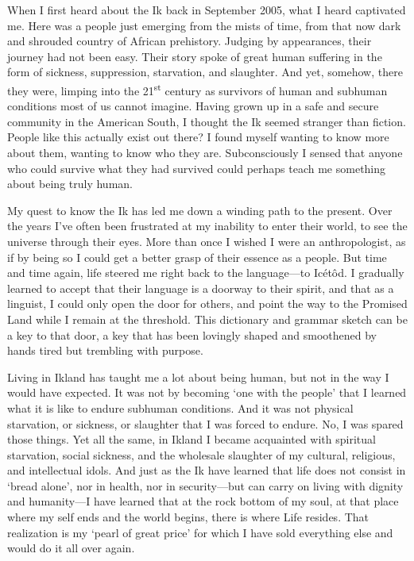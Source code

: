 When I first heard about the Ik back in September 2005, what I heard captivated me. Here was a people just emerging from the mists of time, from that now dark and shrouded country of African prehistory. Judging by appearances, their journey had not been easy. Their story spoke of great human suffering in the form of sickness, suppression, starvation, and slaughter. And yet, somehow, there they were, limping into the 21\textsuperscript{st} century as survivors of human and subhuman conditions most of us cannot imagine. Having grown up in a safe and secure community in the American South, I thought the Ik seemed stranger than fiction. People like this actually exist out there? I found myself wanting to know more about them, wanting to know who they are. Subconsciously I sensed that anyone who could survive what they had survived could perhaps teach me something about being truly human. 

My quest to know the Ik has led me down a winding path to the present. Over the years I’ve often been frustrated at my inability to enter their world, to see the universe through their eyes. More than once I wished I were an anthropologist, as if by being so I could get a better grasp of their essence as a people. But time and time again, life steered me right back to the language—to Icétôd. I gradually learned to accept that their language is a doorway to their spirit, and that as a linguist, I could only open the door for others, and point the way to the Promised Land while I remain at the threshold. This dictionary and grammar sketch can be a key to that door, a key that has been lovingly shaped and smoothened by hands tired but trembling with purpose.

Living in Ikland has taught me a lot about being human, but not in the way I would have expected. It was not by becoming ‘one with the people’ that I learned what it is like to endure subhuman conditions. And it was not physical starvation, or sickness, or slaughter that I was forced to endure. No, I was spared those things. Yet all the same, in Ikland I became acquainted with spiritual starvation, social sickness, and the wholesale slaughter of my cultural, religious, and intellectual idols. And just as the Ik have learned that life does not consist in ‘bread alone’, nor in health, nor in security—but can carry on living with dignity and humanity—I have learned that at the rock bottom of my soul, at that place where my self ends and the world begins, there is where Life resides. That realization is my ‘pearl of great price’ for which I have sold everything else and would do it all over again. 
